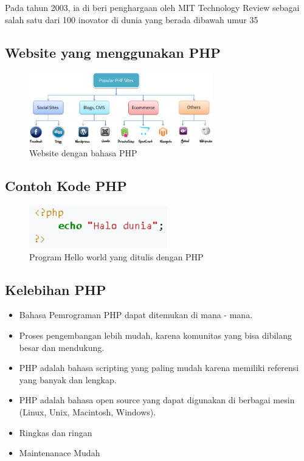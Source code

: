 Pada tahun 2003, ia di beri penghargaan oleh MIT Technology Review sebagai salah satu dari 100 inovator di dunia yang berada dibawah umur 35
\subsection{Website yang menggunakan PHP} 
	\begin{figure}[H]
		\includegraphics[width=8cm]{figures/web/popularphpsites.jpg}
		\centering
		\caption{Website dengan bahasa PHP}
	\end{figure}

\subsection{Contoh Kode PHP}
	\begin{figure}[H]
		\includegraphics[width=6cm]{figures/web/contohkodingphp.png}
		\centering
		\caption{Program Hello world yang ditulis dengan PHP}
	\end{figure}

\subsection{Kelebihan PHP}
\begin{itemize}
	\item Bahasa Pemrograman PHP dapat ditemukan di mana - mana.
	\item Proses pengembangan lebih mudah, karena komunitas yang bisa dibilang besar dan mendukung.
	\item PHP adalah bahasa scripting yang paling mudah karena memiliki referensi yang banyak dan lengkap.
	\item PHP adalah bahasa open source yang dapat digunakan di berbagai mesin (Linux, Unix, Macintosh, Windows).
	\item Ringkas dan ringan
	\item Maintenanace Mudah
\end{itemize}
